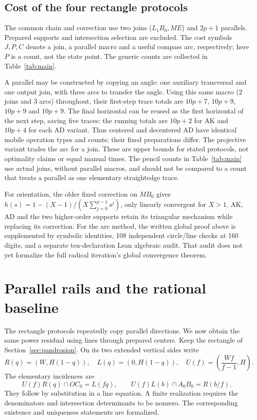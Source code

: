 \documentclass[11pt,a4paper]{article}
\theoremstyle{remark}\newtheorem{remark}[theorem]{Remark}
\begin{document}
\subsection{Cost of the four rectangle protocols}
The common chain and correction use two joins ($L_1B_0,ME$) and $2p+1$ parallels. Prepared supports and intersection selection are excluded. The cost symbols $J,P,C$ denote a join, a parallel macro and a useful compass arc, respectively; here $P$ is a count, not the state point. The generic counts are collected in Table~\ref{tab:main}.

A parallel may be constructed by copying an angle: one auxiliary transversal and one output join, with three arcs to transfer the angle. Using this same macro ($2$ joins and $3$ arcs) throughout, their first-step trace totals are $10p+7$, $10p+9$, $10p+9$ and $10p+9$. The final horizontal can be reused as the first horizontal of the next step, saving five traces: the running totals are $10p+2$ for AK and $10p+4$ for each AD variant. Thus centered and decentered AD have identical mobile operation types and counts; their fixed preparations differ. The projective variant trades the arc for a join. These are upper bounds for stated protocols, not optimality claims or equal manual times. The pencil counts in Table~\ref{tab:main} use actual joins, without parallel macros, and should not be compared to a count that treats a parallel as one elementary straightedge trace.

For orientation, the older fixed correction on $MB_0$ gives $h(s)=1-(X-1)/(X\sum_{j=0}^{p-1}s^j)$, only linearly convergent for $X>1$. AK, AD and the two higher-order supports retain its triangular mechanism while replacing its correction. For the arc method, the written global proof above is supplemented by symbolic identities, 108 independent circle/line checks at 160 digits, and a separate ten-declaration Lean algebraic audit. That audit does not yet formalize the full radical iteration's global convergence theorem.


\section{Parallel rails and the rational baseline}\label{sec:rails}
The rectangle protocols repeatedly copy parallel directions. We now obtain the same power residual using lines through prepared centers. Keep the rectangle of Section~\ref{sec:pandrosion}. On its two extended vertical sides write
\begin{equation}\label{eq:rails}
 R(q)=(W,H(1-q)),\quad L(q)=(0,H(1-q)),\quad
 U(f)=\left(\frac{Wf}{f-1},H\right).
\end{equation}
The elementary incidences are
\begin{equation}\label{eq:incidences}
 U(f)R(q)\cap OC_0=L(fq),\qquad U(f)L(b)\cap A_0B_0=R(b/f).
\end{equation}
They follow by substitution in a line equation. A finite realization requires the denominators and intersection determinants to be nonzero. The corresponding existence and uniqueness statements are formalized.
\end{document}
